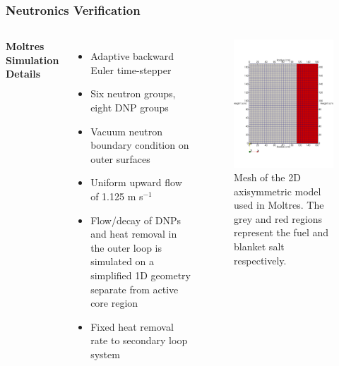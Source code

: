 \begin{frame}
	\frametitle{Neutronics Verification}
	\begin{columns}
		\column{5cm}
		\textbf{Moltres Simulation Details}
		\begin{itemize}
			\item Adaptive backward Euler time-stepper
			\item Six neutron groups, eight \gls{DNP} groups
			\item Vacuum neutron boundary condition on outer surfaces
			\item Uniform upward flow of 1.125 m s$^{-1}$
			\item Flow/decay of \glspl{DNP} and heat removal in the outer loop
			is simulated on a simplified 1D geometry separate from active core
			region
			\item Fixed heat removal rate to secondary loop system
		\end{itemize}
		\column{5cm}
		\begin{figure}
			\centering
			\includegraphics[width=.8\textwidth]{../paper/figures/mesh}
			\caption{Mesh of the 2D axisymmetric model used in Moltres. The
			grey and red regions represent the fuel and blanket salt
			respectively.}
			\label{fig:mesh}
		\end{figure}
	\end{columns}
\end{frame}


